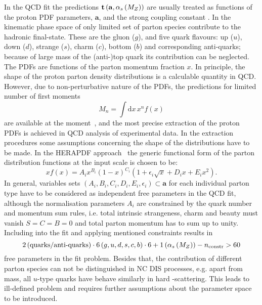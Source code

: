 In the QCD fit the predictions $\mathbf{t}\left( \mathbf{a},\mbox{$\alpha_{s}\left(M_{Z}\right)$}\right)$ are usually treated as functions of the proton PDF parameters, $\mathbf{a}$, and the strong coupling constant \asz. In the kinematic phase space of \hera only limited set of parton species contribute to the hadronic final-state. These are the gluon ($g$), and five quark flavours: up ($u$), down ($d$), strange ($s$), charm ($c$), bottom ($b$) and corresponding anti-quarks; because of large mass of the (anti-)top quark its contribution can be neglected. The PDFs are functions of the parton momentum fraction $x$. In principle, the shape of the proton parton density distributions is a calculable quantity in QCD. However, due to non-perturbative nature of the PDFs, the predictions for limited number of first moments 
\begin{equation}
 M_n=\int\mathrm{d}x\,x^n f\left(x\right)
\end{equation}
are available at the moment~\cite{Hagler:2009ni}, and the most precise extraction of the proton PDFs is achieved in QCD analysis of experimental data. In the extraction procedures some assumptions concerning the shape of the distributions have to be made. In the HERAPDF approach~\cite{Aaron:2009aa} the generic functional form of the parton distribution functions at the input scale is chosen to be:
\begin{equation}
 xf\left(x\right) = A_ix^{B_i}\left(1-x\right)^{C_i}\left(1+\epsilon_i\sqrt{x}+D_ix+E_ix^2\right).
 \label{eq:pdfansatz}
\end{equation}
In general, variables sets $\left(A_i,B_i,C_i,D_i,E_i,\epsilon_i\right)\subset\mathbf{a}$ for each individual parton type have to be considered as independent free parameters in the QCD fit, although the normalisation parameters $A_i$ are constrained by the quark number and momentum sum rules, i.e. total intrinsic strangeness, charm and beauty must vanish $S=C=B=0$ and total parton momentum has to sum up to unity. Including \asz into the fit and applying mentioned constraints results in 
\begin{equation}
2 \left( \text{quarks/anti-quarks}\right)\cdot 6\left(g,u,d,s,c,b\right)\cdot 6 + 1\left(\mbox{$\alpha_{s}\left(M_{Z}\right)$}\right) - n_\text{constr} > 60
\end{equation}
free parameters in the fit problem. Besides that, the contribution of different parton species can not be distinguished in NC DIS processes, e.g. apart from mass, all $u$-type quarks have behave similarly in hard \ep-scattering. 
This leads to ill-defined problem and requires further assumptions about the parameter space to be introduced. 

